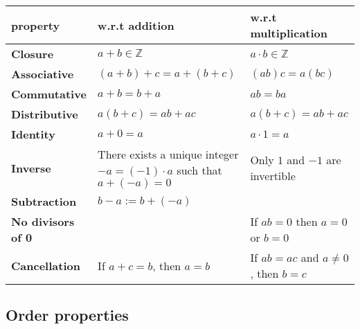 \documentclass[10pt,reqno]{book}
\theoremstyle{plain}
\def\Z{\mathbb{Z}}
\begin{document}
	\begin{center}
		\begin{tabular}{|l|l|l|}
			\hline
			property                  & w.r.t addition                                                                                  & w.r.t multiplication                            \\ \hline
			\textbf{Closure}          & $ a+b \in \Z $                                                                                  & $ a \cdot b \in \Z $                            \\ \hline
			\textbf{Associative}      & $ (a+b) + c = a + (b + c) $                                                                     & $ (ab)c = a(bc) $                               \\ \hline
			\textbf{Commutative}      & $ a + b = b + a $                                                                               & $ ab = ba $                                     \\ \hline
			\textbf{Distributive}     & $ a (b + c) = ab + ac $                                                                         & $ a (b + c) = ab + ac $                         \\ \hline
			\textbf{Identity}         & $ a + 0 = a $                                                                                   & $ a \cdot 1 = a $                               \\ \hline
			\textbf{Inverse}          & \pbox{20cm}{There exists a unique integer $ -a = (-1) \cdot a $ such that \\  $ a + (-a) = 0 $} & Only $ 1 $ and $ -1 $ are invertible            \\ \hline
			\textbf{Subtraction}      & $ b-a := b + (-a) $                                                                             &                                                 \\ \hline
			\textbf{No divisors of 0} &                                                                                                 & If $ ab = 0 $ then $ a = 0 $ or $ b = 0 $       \\ \hline
			\textbf{Cancellation}     & If $ a + c = b $, then $ a = b $                                                                & If $ ab = ac $ and $ a \neq 0 $, then $ b = c $ \\ \hline
		\end{tabular}
	\end{center}
	
	\subsection*{Order properties}
	
\end{document}
